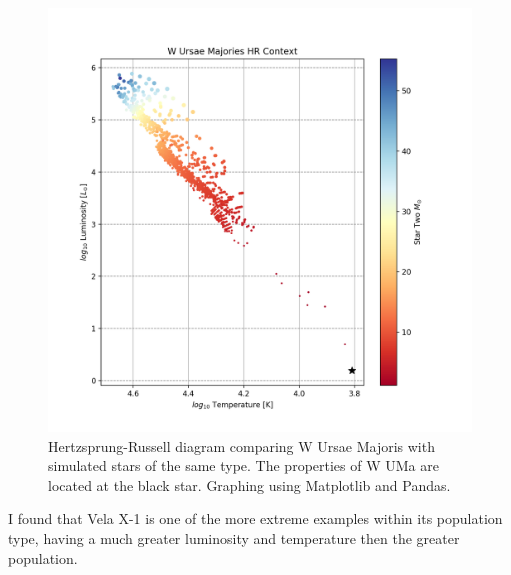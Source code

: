 \documentclass[12pt, a4paper]{article}
\begin{document}
        \begin{figure}[H]
            \centering
            \includegraphics[width = .6\textwidth]{figs/GeneratedFigs/W_UMa/WUMaHRDiagram.png}
            \caption{Hertzsprung-Russell diagram comparing W Ursae Majoris with simulated stars of the same type. The properties of W UMa are located at the black star. Graphing using Matplotlib and Pandas.}
            \label{ContactBinaryTrack}
        \end{figure}
        

        I found that Vela X-1 is one of the more extreme examples within its population type, having a much greater luminosity and temperature then the greater population.
\end{document}
